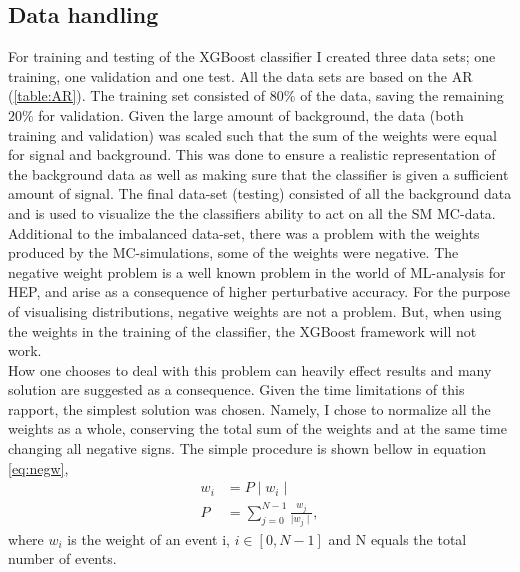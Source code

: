 \documentclass{article}
\begin{document}
\subsection{Data handling}\label{sec:DH}
For training and testing of the XGBoost classifier I created three data sets; one training, one validation and one test. All the data sets are based on the AR (\ref{table:AR}). The training set consisted of $80\%$ of the data, saving the remaining $20\%$ for validation. Given the large amount of background, the data (both training and validation) was scaled such that the sum of the weights were equal for signal and background. This was done to ensure a realistic representation of the background data as well as making sure that the classifier is given a sufficient amount of signal. The final data-set (testing) consisted of all the background data and is used to visualize the the classifiers ability to act on all the SM MC-data.
\\
Additional to the imbalanced data-set, there was a problem with the weights produced by the MC-simulations, some of the weights were negative. The negative weight problem is a well known problem in the world of ML-analysis for HEP, and arise as a consequence of higher perturbative accuracy. For the purpose of visualising distributions, negative weights are not a problem. But, when using the weights in the training of the classifier, the XGBoost framework will not work. 
\\
How one chooses to deal with this problem can heavily effect results and many solution are suggested as a consequence. Given the time limitations of this rapport, the simplest solution was chosen. Namely, I chose to normalize all the weights as a whole, conserving the total sum of the weights and at the same time changing all negative signs. The simple procedure is shown bellow in equation \ref{eq:negw},
\begin{align}\label{eq:negw}
    w_i & = P \mid w_i \mid\,  \\
    P  & =  \sum_{j=0}^{N-1}\frac{ w_j}{\mid w_j \mid},
\end{align}
where $w_i$ is the weight of an event i, $i \in [0,N-1]$ and N equals the total number of events.
\end{document}
